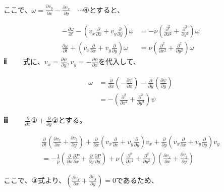 \documentclass[a4paper,11pt]{jsarticle}
\begin{document}
ここで、\(\omega = \frac{\partial v_y}{\partial x} - \frac{\partial v_x}{\partial y} \quad \cdots \text{④}\)とすると、

\begin{align*}
  -\frac{\partial \omega}{\partial t} - \left(v_x \frac{\partial}{\partial x} + v_y \frac{\partial}{\partial y}\right)\omega &= - \nu \left(\frac{\partial^2}{\partial x^2} + \frac{\partial^2}{\partial y^2}\right)\omega \\ 
  \frac{\partial \omega}{\partial t} + \left(v_x \frac{\partial}{\partial x} + v_y \frac{\partial}{\partial y}\right)\omega &= \nu \left(\frac{\partial^2}{\partial x^2} + \frac{\partial^2}{\partial y^2}\right)\omega \tag{2.1}
\end{align*}
\textbf{ⅱ} \(\qquad\)式に、\(v_x = \frac{\partial \psi}{\partial y} , v_y = - \frac{\partial \psi}{\partial x}\)を代入して、

\begin{align*}
  \omega &= \frac{\partial}{\partial x}\left(-\frac{\partial \psi}{\partial x}\right) - \frac{\partial}{\partial y}\left(\frac{\partial \psi}{\partial y}\right) \\
  &= - \left(\frac{\partial^2}{\partial x^2} + \frac{\partial^2}{\partial y^2}\right)\psi \tag{2.2}
\end{align*}

\textbf{ⅲ} \(\qquad \frac{\partial}{\partial x}\text{①} + \frac{\partial}{\partial y}\text{②}\)とする。

 

\begin{gather*}
   \frac{\partial}{\partial t}\left(\frac{\partial v_x}{\partial x} + \frac{\partial v_y}{\partial y}\right) 
   + \frac{\partial}{\partial x}\left(v_x \frac{\partial}{\partial x} + v_y\frac{\partial}{\partial y}\right)v_x
   + \frac{\partial}{\partial y}\left(v_x \frac{\partial}{\partial x} + v_y\frac{\partial}{\partial y}\right) v_y \\
   = -\frac{1}{\rho}\left(\frac{\partial}{\partial x}\frac{\partial P}{\partial x} + \frac{\partial}{\partial y}\frac{\partial P}{\partial y}\right) 
   + \nu\left(\frac{\partial^2}{\partial x^2} + \frac{\partial^2}{\partial y^2}\right)\left(\frac{\partial v_x}{\partial x} + \frac{\partial v_y}{\partial y}\right)
\end{gather*}

ここで、\(\text{③}\)式より、\(\left(\frac{\partial v_x}{\partial x} + \frac{\partial v_y}{\partial y}\right) = 0\)であるため、
\end{document}

